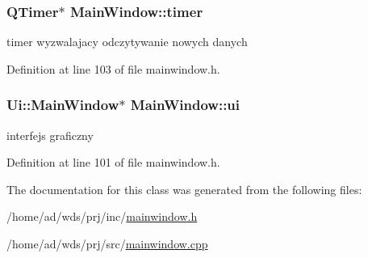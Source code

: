 \subsubsection[{\texorpdfstring{timer}{timer}}]{\setlength{\rightskip}{0pt plus 5cm}Q\+Timer$\ast$ Main\+Window\+::timer\hspace{0.3cm}{\ttfamily [private]}}\hypertarget{class_main_window_a356578805ed1248a7f2807434cb0e5ee}{}\label{class_main_window_a356578805ed1248a7f2807434cb0e5ee}
timer wyzwalajacy odczytywanie nowych danych 

Definition at line 103 of file mainwindow.\+h.

\subsubsection[{\texorpdfstring{ui}{ui}}]{\setlength{\rightskip}{0pt plus 5cm}Ui\+::\+Main\+Window$\ast$ Main\+Window\+::ui\hspace{0.3cm}{\ttfamily [private]}}\hypertarget{class_main_window_a35466a70ed47252a0191168126a352a5}{}\label{class_main_window_a35466a70ed47252a0191168126a352a5}
interfejs graficzny 

Definition at line 101 of file mainwindow.\+h.



The documentation for this class was generated from the following files\+:\begin{DoxyCompactItemize}
\item 
/home/ad/wds/prj/inc/\hyperlink{mainwindow_8h}{mainwindow.\+h}\item 
/home/ad/wds/prj/src/\hyperlink{mainwindow_8cpp}{mainwindow.\+cpp}\end{DoxyCompactItemize}
